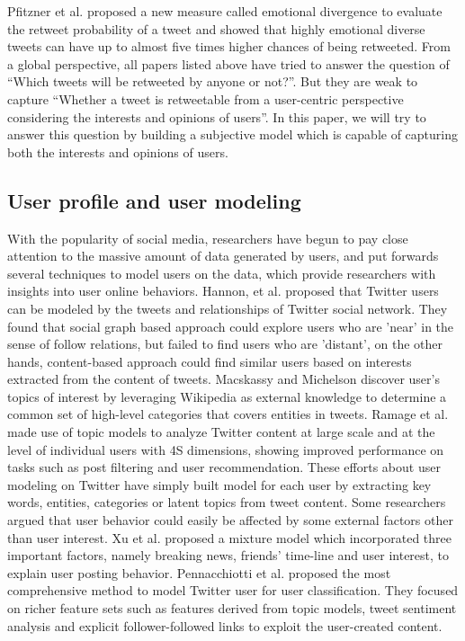 \documentclass[preprint]{elsarticle}
\begin{document}
Pfitzner et al.\cite{conf/icwsm/PfitznerGS12} proposed a new measure called emotional divergence to evaluate the retweet probability of a tweet and showed that highly emotional diverse tweets can have up to almost five times higher chances of being retweeted.
From a global perspective, all papers listed above have tried to answer the question of ``Which tweets will be retweeted by anyone or not?''. 
But they are weak to capture ``Whether a tweet is retweetable from a user-centric perspective considering the interests and opinions of users''. 
In this paper, we will try to answer this question by building a subjective model which is capable of capturing both the interests and opinions of users.
\subsection{User profile and user modeling}
With the popularity of social media, researchers have begun to pay close attention to the massive amount of data generated by users, and put forwards several techniques to model users on the data, which provide researchers with insights into user online behaviors. 
Hannon, et al.\cite{Hannon:2010} proposed that Twitter users can be modeled by the tweets and relationships of Twitter social network.
They found that social graph based approach could explore users who are ’near’ in the sense of follow relations, but failed to find users who are ’distant’, on the other hands, content-based approach could find similar users based on interests extracted from the content of tweets. 
Macskassy and Michelson\cite{conf/icwsm/MacskassyM11} discover user’s topics of interest by leveraging Wikipedia as external knowledge to determine a common set of high-level categories that covers entities in tweets. 
Ramage et al.\cite{RamageEtAl:10} made use of topic models to analyze Twitter content at large scale and at the level of individual users with 4S dimensions, showing improved performance on tasks such as post filtering and user recommendation. 
These efforts about user modeling on Twitter have simply built model for each user by extracting key words, entities, categories or latent topics from tweet content. 
Some researchers argued that user behavior could easily be affected by some external factors other than user interest.
Xu et al.\cite{Xu:2012MUP} proposed a mixture model which incorporated three important factors, namely breaking news, friends’ time-line and user interest, to explain user posting behavior.
Pennacchiotti et al.\cite{Pennacchiotti:icwsm11} proposed the most comprehensive method to model Twitter user for user classification. They focused on richer feature sets such as features derived from topic models, tweet sentiment analysis and explicit follower-followed links to exploit the user-created content. 
\end{document}
